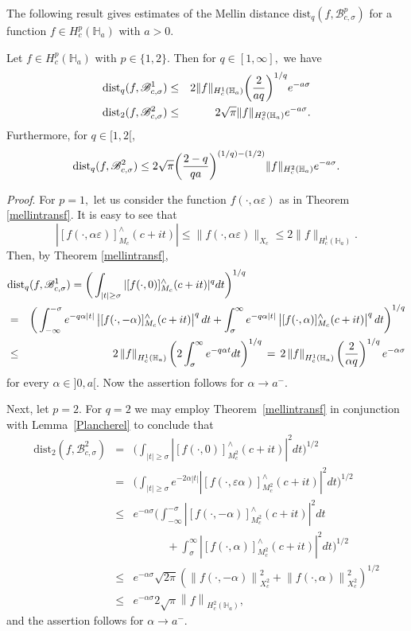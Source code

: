 \documentclass[amsmath,english,a4paper,graphicx,12pt]{article}
\newcommand{\eps}{\mbox{$\varepsilon$}}
\newcommand{\li}{\left}
\newcommand{\ri}{\right}
\newcommand{\abs}[1]{\left|#1\right|}
\begin{document}
The following result gives estimates of the Mellin distance $\mbox{dist}_q(f, \mathscr{B}^p_{c, \sigma})$ for a function 
$f \in H^p_c(\mathbb{H}_a)$ with $a>0.$
\begin{Theorem}\label{distance1}
Let $f \in H^p_c(\mathbb{H}_a)$ with $p\in \{1,2\}.$ Then for $q \in [1, \infty],$ we have
\begin{eqnarray*}
\mbox{\rm dist}_q(f, \mathscr{B}^1_{c, \sigma}) & \leq &2\|f\|_{H^1_c(\mathbb{H}_a)} \bigg(\frac{2}{aq}\bigg)^{1/q} e^{-a\sigma}\\
\mbox{\rm dist}_2(f, \mathscr{B}^2_{c, \sigma})  &\leq &2\sqrt{\pi}\|f\|_{H^2_c(\mathbb{H}_a)} e^{-a\sigma}.
\end{eqnarray*}
Furthermore,  for $q \in [1,2{[}$,
$$\mbox{\rm dist}_q(f, \mathscr{B}^2_{c, \sigma}) \leq 2\sqrt{\pi}\bigg(\frac{2-q}{qa}\bigg)^{(1/q) - (1/2)}\|f\|_{H^2_c(\mathbb{H}_a)} e^{-a\sigma}.$$
\end{Theorem}
{\it Proof}. For $p=1,$ let us consider the function $f(\cdot, \alpha \varepsilon)$ as in Theorem \ref{mellintransf}. It is easy to see that
$$|[f(\cdot,\alpha \varepsilon)]^\wedge_{M_c}(c+it)| \leq \|f(\cdot,\alpha\varepsilon)\|_{X_c} \leq 2\|f\|_{H^1_c(\mathbb{H}_a)}.$$
Then, by Theorem \ref{mellintransf},
\begin{eqnarray*}
\lefteqn{\mbox{dist}_q(f, \mathscr{B}^1_{c, \sigma}) = \bigg(\int_{|t| \geq \sigma}|[f(\cdot, 0)]^\wedge_{M_c}(c+it)|^qdt\bigg)^{1/q}}\\
&=& \bigg(\int_{-\infty}^{-\sigma} e^{-q\alpha |t|}\abs{[f(\cdot, -\alpha)]^\wedge_{M_c}(c+it)}^q dt
     + \int_\sigma^\infty e^{-q\alpha |t|}\abs{[f(\cdot, \alpha)]^\wedge_{M_c}(c+it)}^q dt \bigg)^{1/q}\\
&\le& 2 \li\|f\ri\|_{H_c^1(\mathbb{H}_a)} \li(2\int_\sigma^\infty e^{-q\alpha t} dt\ri)^{1/q} \,=\, 
      2 \li\|f\ri\|_{H_c^1(\mathbb{H}_a)} \li(\frac{2}{\alpha q}\ri)^{1/q} e^{-\alpha \sigma}
\end{eqnarray*}
for every $\alpha \in {]}0,a{[}.$ Now the assertion follows for $\alpha \rightarrow a^-.$

Next, let $p=2.$ For $q=2$ we may employ Theorem~\ref{mellintransf} in conjunction with Lemma~\ref{Plancherel} to conclude that
\begin{eqnarray*}
\mbox{dist}_2(f, \mathscr{B}^2_{c, \sigma}) &=&\bigg(\int_{|t| \geq \sigma}\abs{[f(\cdot, 0)]^\wedge_{M^2_c}(c+it)}^2dt\bigg)^{1/2}\\
  &=&\bigg(\int_{|t| \geq \sigma}e^{-2\alpha\abs{t}}\abs{[f(\cdot, \eps\alpha)]^\wedge_{M^2_c}(c+it)}^2dt\bigg)^{1/2}\\
  &\le&e^{-\alpha\sigma}\bigg(\int_{-\infty}^{-\sigma}\abs{[f(\cdot, -\alpha)]^\wedge_{M^2_c}(c+it)}^2dt \\
  && \qquad\quad +\int_\sigma^\infty \abs{[f(\cdot, \alpha)]^\wedge_{M^2_c}(c+it)}^2dt \bigg)^{1/2}\\
  &\le& e^{-\alpha\sigma} \sqrt{2\pi} \li(\li\|f( \cdot, -\alpha)\ri\|_{X_c^2}^2 +\li\|f( \cdot, \alpha)\ri\|_{X_c^2}^2\ri)^{1/2}\\
  &\le& e^{-\alpha\sigma} 2\sqrt{\pi} \li\|f\ri\|_{H_c^2(\mathbb{H}_a)},  
\end{eqnarray*}
and the assertion follows for $\alpha \rightarrow a^-.$
\end{document}
